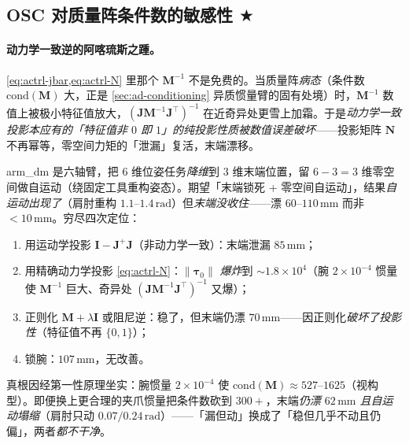 \subsection{OSC 对质量阵条件数的敏感性 \texorpdfstring{$\bigstar$}{(进阶)}}
\label{sec:actrl-osc-illcond}

\paragraph{动力学一致逆的阿喀琉斯之踵。}
\cref{eq:actrl-jbar,eq:actrl-N} 里那个 $\mathbf{M}^{-1}$ 不是免费的。当质量阵\emph{病态}（条件数 $\mathrm{cond}(\mathbf{M})$ 大，正是 \cref{sec:ad-conditioning} 异质惯量臂的固有处境）时，$\mathbf{M}^{-1}$ 数值上被极小特征值放大，$(\mathbf{J}\mathbf{M}^{-1}\mathbf{J}^\top)^{-1}$ 在近奇异处更雪上加霜。于是\emph{动力学一致投影本应有的「特征值非 $0$ 即 $1$」的纯投影性质被数值误差破坏}——投影矩阵 $\mathbf{N}$ 不再幂等，零空间力矩的「泄漏」复活，末端漂移。

\begin{note}
arm\_dm 是六轴臂，把 $6$ 维位姿任务\emph{降维}到 $3$ 维末端位置，留 $6-3=3$ 维零空间做自运动（绕固定工具重构姿态）。期望「末端锁死 + 零空间自运动」，结果\emph{自运动出现了}（肩肘重构 $1.1$--$1.4\,\mathrm{rad}$）但\emph{末端没收住}——漂 $60$--$110\,\mathrm{mm}$ 而非 $<10\,\mathrm{mm}$。穷尽四次定位：
\begin{enumerate}
  \item 用运动学投影 $\mathbf{I}-\mathbf{J}^+\mathbf{J}$（非动力学一致）：末端泄漏 $85\,\mathrm{mm}$；
  \item 用精确动力学投影 \cref{eq:actrl-N}：$\|\boldsymbol{\tau}_0\|$ \emph{爆炸}到 $\sim1.8\times10^4$（腕 $2\times10^{-4}$ 惯量使 $\mathbf{M}^{-1}$ 巨大、奇异处 $(\mathbf{J}\mathbf{M}^{-1}\mathbf{J}^\top)^{-1}$ 又爆）；
  \item 正则化 $\mathbf{M}+\lambda\mathbf{I}$ 或阻尼逆：稳了，但末端仍漂 $70\,\mathrm{mm}$——因正则化\emph{破坏了投影性}（特征值不再 $\{0,1\}$）；
  \item 锁腕：$107\,\mathrm{mm}$，无改善。
\end{enumerate}
真根因经第一性原理坐实：腕惯量 $2\times10^{-4}$ 使 $\mathrm{cond}(\mathbf{M})\approx527$--$1625$（视构型）。即便换上更合理的夹爪惯量把条件数砍到 $300+$，末端\emph{仍漂 $62\,\mathrm{mm}$ 且自运动塌缩}（肩肘只动 $0.07/0.24\,\mathrm{rad}$）——「漏但动」换成了「稳但几乎不动且仍偏」，两者\emph{都不干净}。
\end{note}

